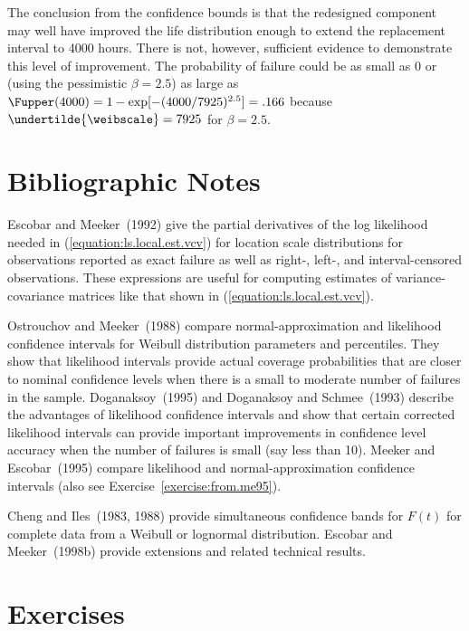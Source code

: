 \begin{example}
The conclusion from the confidence bounds is that the redesigned
component may well have improved the life distribution enough to
extend the replacement interval to 4000 hours.  There is not, however,
sufficient evidence to demonstrate this level of improvement.  The
probability of failure could be as small as $0$ or (using the
pessimistic $\beta=2.5$) as large as $\Fupper(4000) =
1-\exp[-(4000/7925)^{2.5}]=.166$ because
$\undertilde{\weibscale}=7925$ for $\beta=2.5$.
\end{example}


\section*{Bibliographic Notes}

Escobar and Meeker~(1992) give the partial derivatives of the log
likelihood needed in (\ref{equation:ls.local.est.vcv}) for location
scale distributions for observations reported as exact failure as well
as right-, left-, and interval-censored observations. These expressions
are useful for computing estimates of variance-covariance matrices
like that shown in (\ref{equation:ls.local.est.vcv}).

Ostrouchov and Meeker~(1988) compare normal-approximation and
likelihood confidence intervals for Weibull distribution parameters
and percentiles. They show that likelihood intervals provide actual
coverage probabilities that are closer to nominal confidence levels
when there is a small to moderate number of failures in the sample.
Doganaksoy~(1995) and Doganaksoy and Schmee~(1993) describe the
advantages of likelihood confidence intervals and show that certain
corrected likelihood intervals can provide important improvements in
confidence level accuracy when the number of failures is small (say
less than 10).  Meeker and Escobar~(1995) compare likelihood and
normal-approximation confidence intervals (also see
Exercise~\ref{exercise:from.me95}).

Cheng and Iles~(1983, 1988) provide simultaneous confidence bands
for $F(t)$ for complete data from a Weibull or lognormal distribution.
Escobar and Meeker~(1998b) provide extensions and related technical results.
\section*{Exercises}

